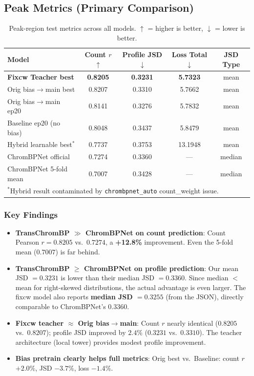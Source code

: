 \documentclass[11pt,a4paper]{article}
\newcommand{\good}[1]{\textcolor{goodgreen}{\textbf{#1}}}
\begin{document}
\subsection{Peak Metrics (Primary Comparison)}

\begin{table}[h]
\centering
\caption{Peak-region test metrics across all models. $\uparrow$ = higher is better, $\downarrow$ = lower is better.}
\label{tab:peak_metrics}
\small
\begin{tabular}{l c c c c}
\toprule
\textbf{Model} & \textbf{Count $r$ $\uparrow$} & \textbf{Profile JSD $\downarrow$} & \textbf{Loss Total $\downarrow$} & \textbf{JSD Type} \\
\midrule
\good{Fixcw Teacher best} & \good{0.8205} & \good{0.3231} & \good{5.7323} & mean \\
Orig bias$\to$main best & 0.8207 & 0.3310 & 5.7662 & mean \\
Orig bias$\to$main ep20 & 0.8141 & 0.3276 & 5.7832 & mean \\
Baseline ep20 (no bias) & 0.8048 & 0.3437 & 5.8479 & mean \\
Hybrid learnable best$^*$ & 0.7737 & 0.3753 & 13.1948 & mean \\
\midrule
ChromBPNet official & 0.7274 & 0.3360 & --- & median \\
ChromBPNet 5-fold mean & 0.7007 & 0.3428 & --- & median \\
\bottomrule
\multicolumn{5}{l}{\footnotesize $^*$Hybrid result contaminated by \texttt{chrombpnet\_auto} count\_weight issue.}
\end{tabular}
\end{table}

\subsubsection{Key Findings}

\begin{itemize}
\item \textbf{TransChromBP $\gg$ ChromBPNet on count prediction}: Count Pearson $r = 0.8205$ vs.\ $0.7274$, a \textbf{+12.8\%} improvement. Even the 5-fold mean ($0.7007$) is far behind.
\item \textbf{TransChromBP $\geq$ ChromBPNet on profile prediction}: Our mean JSD $= 0.3231$ is lower than their median JSD $= 0.3360$. Since median $<$ mean for right-skewed distributions, the actual advantage is even larger. The fixcw model also reports \textbf{median JSD $= 0.3255$} (from the JSON), directly comparable to ChromBPNet's $0.3360$.
\item \textbf{Fixcw teacher $\approx$ Orig bias$\to$main}: Count $r$ nearly identical ($0.8205$ vs.\ $0.8207$); profile JSD improved by $2.4\%$ ($0.3231$ vs.\ $0.3310$). The teacher architecture (local tower) provides modest profile improvement.
\item \textbf{Bias pretrain clearly helps full metrics}: Orig best vs.\ Baseline: count $r$ $+2.0\%$, JSD $-3.7\%$, loss $-1.4\%$.
\end{itemize}
\end{document}
